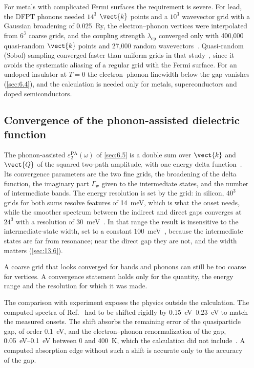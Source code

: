 For metals with complicated Fermi surfaces the requirement is severe. For lead, the DFPT phonons needed $14^3$ $\vect{k}$ points and a $10^3$ wavevector grid with a Gaussian broadening of \SI{0.025}{Ry}, the electron--phonon vertices were interpolated from $6^3$ coarse grids, and the coupling strength $\lambda_{\mathrm{ep}}$ converged only with 400{,}000 quasi-random $\vect{k}$ points and 27{,}000 random wavevectors~\cite[Fig.~12]{ponce2016epw}. Quasi-random (Sobol) sampling converged faster than uniform grids in that study~\cite{ponce2016epw}, since it avoids the systematic aliasing of a regular grid with the Fermi surface. For an undoped insulator at $T = 0$ the electron--phonon linewidth below the gap vanishes (\cref{sec:6.4}), and the calculation is needed only for metals, superconductors and doped semiconductors.

\subsection{Convergence of the phonon-assisted dielectric function}

The phonon-assisted $\varepsilon_2^{\mathrm{PA}}(\omega)$ of \cref{sec:6.5} is a double sum over $\vect{k}$ and $\vect{Q}$ of the squared two-path amplitude, with one energy delta function~\cite[Eqs.~(1)--(3)]{noffsinger2012phonon}. Its convergence parameters are the two fine grids, the broadening of the delta function, the imaginary part $\varGamma_{\mathrm{w}}$ given to the intermediate states, and the number of intermediate bands. The energy resolution is set by the grid: in silicon, $40^3$ grids for both sums resolve features of \SI{14}{meV}, which is what the onset needs, while the smoother spectrum between the indirect and direct gaps converges at $24^3$ with a resolution of \SI{30}{meV}~\cite{noffsinger2012phonon}. In that range the result is insensitive to the intermediate-state width, set to a constant \SI{100}{meV}~\cite{noffsinger2012phonon}, because the intermediate states are far from resonance; near the direct gap they are not, and the width matters (\cref{sec:13.6}).

A coarse grid that looks converged for bands and phonons can still be too coarse for vertices. A convergence statement holds only for the quantity, the energy range and the resolution for which it was made.

The comparison with experiment exposes the physics outside the calculation. The computed spectra of Ref.~\cite{noffsinger2012phonon} had to be shifted rigidly by \SIrange{0.15}{0.23}{eV} to match the measured onsets. The shift absorbs the remaining error of the quasiparticle gap, of order \SI{0.1}{eV}, and the electron--phonon renormalization of the gap, \SIrange{0.05}{0.1}{eV} between 0 and \SI{400}{K}, which the calculation did not include~\cite{noffsinger2012phonon}. A computed absorption edge without such a shift is accurate only to the accuracy of the gap.

